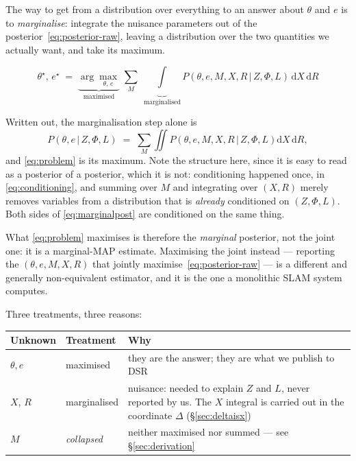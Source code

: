 \documentclass[11pt,a4paper]{report}
\newcommand{\given}{\,|\,}
\theoremstyle{definition}   %
\begin{document}
The way to get from a distribution over everything to an answer about $\theta$ and $e$ is to
\emph{marginalise}: integrate the nuisance parameters out of the posterior~\eqref{eq:posterior-raw},
leaving a distribution over the two quantities we actually want, and take its maximum.

\begin{equation}
\boxed{\;
\theta^\star,\,e^\star
\;=\;
\underbrace{\arg\max_{\theta,\,e}}_{\text{maximised}}\;
\sum_{M}\;
\underbrace{\int}_{\text{marginalised}}
P\!\left(\theta,e,M,X,R \given Z,\Phi,L\right)\,
\mathrm{d}X\,\mathrm{d}R \; }
\label{eq:problem}
\end{equation}

\noindent
Written out, the marginalisation step alone is
\begin{equation}
P\!\left(\theta,e\given Z,\Phi,L\right)\;=\;\sum_M\iint
P\!\left(\theta,e,M,X,R\given Z,\Phi,L\right)\mathrm{d}X\,\mathrm{d}R ,
\label{eq:marginalpost}
\end{equation}
and \eqref{eq:problem} is its maximum. Note the structure here, since it is easy to read as a
posterior of a posterior, which it is not:
conditioning happened once, in \eqref{eq:conditioning}, and summing over $M$ and integrating over
$(X,R)$ merely removes variables from a distribution that is \emph{already} conditioned on
$(Z,\Phi,L)$. Both sides of \eqref{eq:marginalpost} are conditioned on the same thing.

What \eqref{eq:problem} maximises is therefore the \emph{marginal} posterior, not the joint one:
it is a marginal-MAP estimate. Maximising the joint instead --- reporting the $(\theta,e,M,X,R)$ that
jointly maximise~\eqref{eq:posterior-raw} --- is a different and generally non-equivalent
estimator, and it is the one a monolithic SLAM system computes.

Three treatments, three reasons:
\begin{center}
\begin{tabular}{@{}llp{8.1cm}@{}}
\toprule
Unknown & Treatment & Why \\
\midrule
$\theta,e$ & maximised & they are the answer; they are what we publish to DSR \\[2pt]
$X$, $R$   & marginalised & nuisance: needed to explain $Z$ and $L$, never reported by us. The
                            $X$ integral is carried out in the coordinate $\Delta$
                            (\S\ref{sec:deltaisx}) \\[2pt]
$M$        & \emph{collapsed} & neither maximised nor summed --- see \S\ref{sec:derivation} \\
\bottomrule
\end{tabular}
\end{center}
\end{document}
